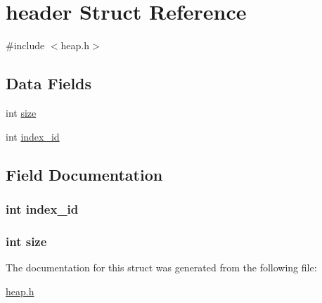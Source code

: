 \hypertarget{structheader}{}\section{header Struct Reference}
\label{structheader}


{\ttfamily \#include $<$heap.\+h$>$}

\subsection*{Data Fields}
\begin{DoxyCompactItemize}
\item 
int \hyperlink{structheader_a439227feff9d7f55384e8780cfc2eb82}{size}
\item 
int \hyperlink{structheader_af535dc35cc74e67b62de5a0a3540becd}{index\+\_\+id}
\end{DoxyCompactItemize}


\subsection{Field Documentation}
\hypertarget{structheader_af535dc35cc74e67b62de5a0a3540becd}{}
\subsubsection[{index\+\_\+id}]{\setlength{\rightskip}{0pt plus 5cm}int index\+\_\+id}\label{structheader_af535dc35cc74e67b62de5a0a3540becd}
\hypertarget{structheader_a439227feff9d7f55384e8780cfc2eb82}{}
\subsubsection[{size}]{\setlength{\rightskip}{0pt plus 5cm}int size}\label{structheader_a439227feff9d7f55384e8780cfc2eb82}


The documentation for this struct was generated from the following file\+:\begin{DoxyCompactItemize}
\item 
\hyperlink{heap_8h}{heap.\+h}\end{DoxyCompactItemize}
